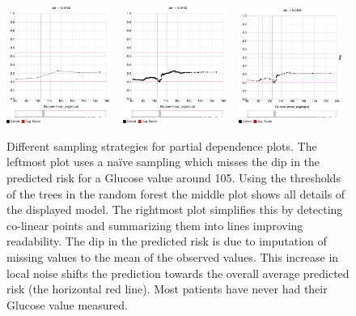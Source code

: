 \begin{figure}[t]
\centering
\includegraphics[width=0.3\textwidth]{prospector/sampling_1} %
~
\includegraphics[width=0.3\textwidth]{prospector/sampling_2} %
~
\includegraphics[width=0.3\textwidth]{prospector/sampling_3} %
\caption{
Different sampling strategies for partial dependence plots.
The leftmost plot uses a na\"ive sampling which misses the
dip in the predicted risk for a Glucose value around 105.
Using the thresholds of the trees in the random forest
the middle plot shows all details of the displayed model.
The rightmost plot simplifies this by detecting co-linear points
and summarizing them into lines improving readability.
The dip in the predicted risk is due to imputation of missing values
to the mean of the observed values.
This increase in local noise shifts the prediction towards the overall
average predicted risk (the horizontal red line).
Most patients have never had their Glucose value measured.
}
\label{figs:sampling}
\end{figure}